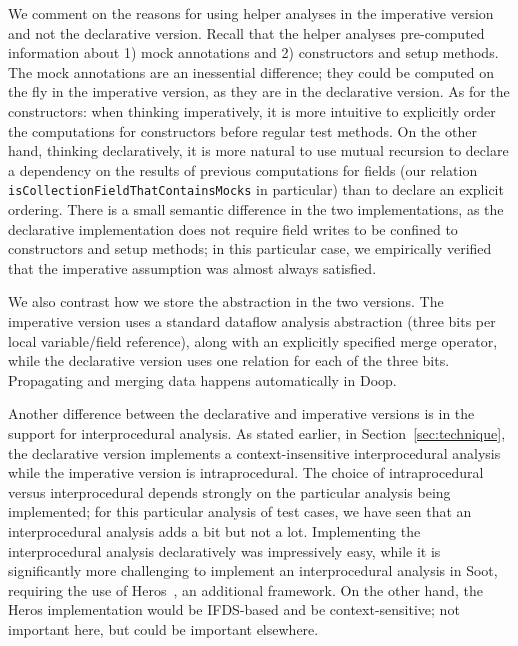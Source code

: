 We comment on the reasons for using helper analyses in the imperative version and not the declarative version. Recall that the helper analyses pre-computed information about 1) mock annotations and 2) constructors and setup methods. The mock annotations are an inessential difference; they could be computed on the fly in the imperative version, as they are in the declarative version. As for the constructors: when thinking imperatively, it is more intuitive to explicitly order the computations for constructors before regular test methods. On the other hand, thinking declaratively, it is more natural to use mutual recursion to declare a dependency on the results of previous computations for fields (our relation \texttt{isCollectionFieldThatContainsMocks} in particular) than to declare an explicit ordering. There is a small semantic difference in the two implementations, as the declarative implementation does not require field writes to be confined to constructors and setup methods; in this particular case, we empirically verified that the imperative assumption was almost always satisfied.

We also contrast how we store the abstraction in the two versions. The imperative version uses a standard dataflow analysis abstraction (three bits per local variable/field reference), along with an explicitly specified merge operator, while the declarative version uses one relation for each of the three bits. Propagating and merging data happens automatically in Doop.

Another difference between the declarative and imperative versions is in the support for interprocedural analysis. As stated earlier, in Section~\ref{sec:technique}, the declarative version implements a context-insensitive interprocedural analysis while the imperative version is intraprocedural. The choice of intraprocedural versus interprocedural depends strongly on the particular analysis being implemented; for this particular analysis of test cases, we have seen that an interprocedural analysis adds a bit but not a lot. Implementing the interprocedural analysis declaratively was impressively easy, while it is significantly more challenging to implement an interprocedural analysis in Soot, requiring the use of Heros~\cite{soap12ifds}, an additional framework. On the other hand, the Heros implementation would be IFDS-based and be context-sensitive; not important here, but could be important elsewhere.

